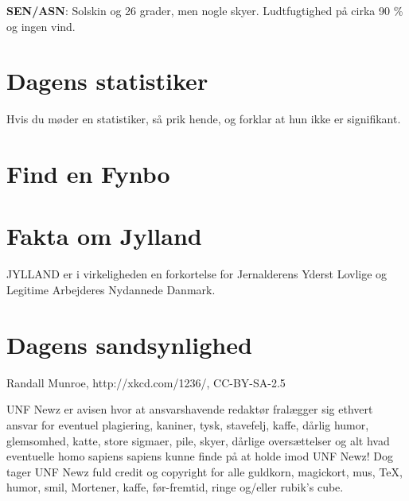 \begin{minipage}[b]{0.95\linewidth}
\begin{minipage}[t]{0.47\textwidth}
\textbf{SEN/ASN}: Solskin og 26 grader, men nogle skyer. Ludtfugtighed på cirka 90 \% og ingen vind.

\vspace{-2mm}
\section*{Dagens statistiker}
Hvis du møder en statistiker, så prik hende, og forklar at hun ikke er signifikant.

\vspace{-2mm}
\section*{Find en Fynbo}

\vspace{-2mm}
\section*{Fakta om Jylland}
JYLLAND er i virkeligheden en forkortelse for Jernalderens Yderst Lovlige og Legitime Arbejderes Nydannede Danmark.

\vspace{-2mm}
\section*{Dagens sandsynlighed}

\vspace{1mm}
\tiny Randall Munroe, http://xkcd.com/1236/, CC-BY-SA-2.5
\end{minipage}

\begin{center}
\tiny UNF Newz er avisen hvor at ansvarshavende redaktør fralægger sig ethvert ansvar for eventuel plagiering, kaniner, tysk, stavefelj, kaffe, dårlig humor, glemsomhed, katte, store sigmaer, pile, skyer, dårlige oversættelser og alt hvad eventuelle homo sapiens sapiens kunne finde på at holde imod UNF Newz! Dog tager UNF Newz fuld credit og copyright for alle guldkorn, magickort, mus, \TeX, humor, smil, Mortener, kaffe, før-fremtid, ringe og/eller rubik's cube.
\end{center}
\end{minipage}

